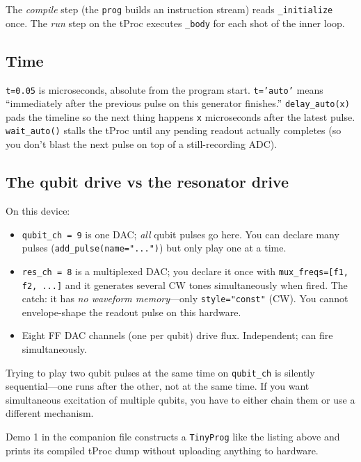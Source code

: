 \documentclass[11pt,letterpaper]{article}
\begin{document}
The \emph{compile} step (the \texttt{prog} builds an instruction stream) reads \texttt{\_initialize} once. The \emph{run} step on the tProc executes \texttt{\_body} for each shot of the inner loop.

\subsection{Time}
\texttt{t=0.05} is microseconds, absolute from the program start. \texttt{t='auto'} means ``immediately after the previous pulse on this generator finishes.'' \texttt{delay\_auto(x)} pads the timeline so the next thing happens \texttt{x} microseconds after the latest pulse. \texttt{wait\_auto()} stalls the tProc until any pending readout actually completes (so you don't blast the next pulse on top of a still-recording ADC).

\subsection{The qubit drive vs the resonator drive}
On this device:
\begin{itemize}[leftmargin=*]
  \item \texttt{qubit\_ch = 9} is one DAC; \emph{all} qubit pulses go here. You can declare many pulses (\texttt{add\_pulse(name="...")}) but only play one at a time.
  \item \texttt{res\_ch = 8} is a multiplexed DAC; you declare it once with \texttt{mux\_freqs=[f1, f2, ...]} and it generates several CW tones simultaneously when fired. The catch: it has \emph{no waveform memory}---only \texttt{style="const"} (CW). You cannot envelope-shape the readout pulse on this hardware.
  \item Eight FF DAC channels (one per qubit) drive flux. Independent; can fire simultaneously.
\end{itemize}

\begin{pitfall}
Trying to play two qubit pulses at the same time on \texttt{qubit\_ch} is silently sequential---one runs after the other, not at the same time. If you want simultaneous excitation of multiple qubits, you have to either chain them or use a different mechanism.
\end{pitfall}

\begin{tryit}
Demo 1 in the companion file constructs a \texttt{TinyProg} like the listing above and prints its compiled tProc dump without uploading anything to hardware.
\end{tryit}
\end{document}

